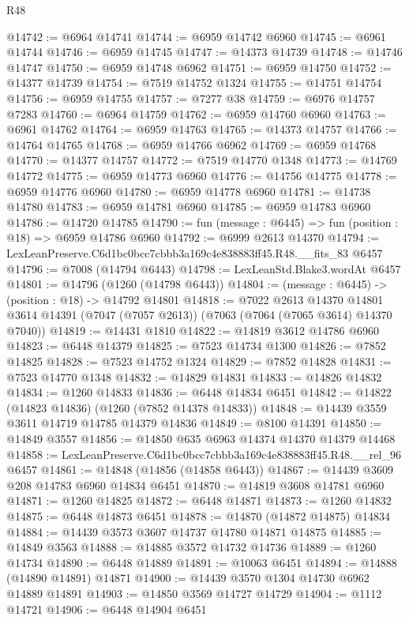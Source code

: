 \begin{lexlean}{R48}
\begin{coremodule}
@14742 := @6964 @14741
@14744 := @6959 @14742 @6960
@14745 := @6961 @14744
@14746 := @6959 @14745
@14747 := @14373 @14739
@14748 := @14746 @14747
@14750 := @6959 @14748 @6962
@14751 := @6959 @14750
@14752 := @14377 @14739
@14754 := @7519 @14752 @1324
@14755 := @14751 @14754
@14756 := @6959 @14755
@14757 := @7277 @38
@14759 := @6976 @14757 @7283
@14760 := @6964 @14759
@14762 := @6959 @14760 @6960
@14763 := @6961 @14762
@14764 := @6959 @14763
@14765 := @14373 @14757
@14766 := @14764 @14765
@14768 := @6959 @14766 @6962
@14769 := @6959 @14768
@14770 := @14377 @14757
@14772 := @7519 @14770 @1348
@14773 := @14769 @14772
@14775 := @6959 @14773 @6960
@14776 := @14756 @14775
@14778 := @6959 @14776 @6960
@14780 := @6959 @14778 @6960
@14781 := @14738 @14780
@14783 := @6959 @14781 @6960
@14785 := @6959 @14783 @6960
@14786 := @14720 @14785
@14790 := fun (message : @6445) => fun (position : @18) => @6959 @14786 @6960
@14792 := @6999 @2613 @14370
@14794 := LexLeanPreserve.C6d1bc0bcc7cbbb3a169c4e838883ff45.R48.__fits_83 @6457
@14796 := @7008 (@14794 @6443)
@14798 := LexLeanStd.Blake3.wordAt @6457
@14801 := @14796 (@1260 (@14798 @6443))
@14804 := (message : @6445) -> (position : @18) -> @14792 @14801
@14818 := @7022
    @2613
    @14370
    @14801
    @3614
    @14391
    (@7047 (@7057 @2613))
    (@7063 (@7064 (@7065 @3614) @14370 @7040))
@14819 := @14431 @1810
@14822 := @14819 @3612 @14786 @6960
@14823 := @6448 @14379
@14825 := @7523 @14734 @1300
@14826 := @7852 @14825
@14828 := @7523 @14752 @1324
@14829 := @7852 @14828
@14831 := @7523 @14770 @1348
@14832 := @14829 @14831
@14833 := @14826 @14832
@14834 := @1260 @14833
@14836 := @6448 @14834 @6451
@14842 := @14822 (@14823 @14836) (@1260 (@7852 @14378 @14833))
@14848 := @14439 @3559 @3611 @14719 @14785 @14379 @14836
@14849 := @8100 @14391
@14850 := @14849 @3557
@14856 := @14850 @635 @6963 @14374 @14370 @14379 @14468
@14858 := LexLeanPreserve.C6d1bc0bcc7cbbb3a169c4e838883ff45.R48.__rel_96 @6457
@14861 := @14848 (@14856 (@14858 @6443))
@14867 := @14439 @3609 @208 @14783 @6960 @14834 @6451
@14870 := @14819 @3608 @14781 @6960
@14871 := @1260 @14825
@14872 := @6448 @14871
@14873 := @1260 @14832
@14875 := @6448 @14873 @6451
@14878 := @14870 (@14872 @14875) @14834
@14884 := @14439 @3573 @3607 @14737 @14780 @14871 @14875
@14885 := @14849 @3563
@14888 := @14885 @3572 @14732 @14736
@14889 := @1260 @14734
@14890 := @6448 @14889
@14891 := @10063 @6451
@14894 := @14888 (@14890 @14891) @14871
@14900 := @14439 @3570 @1304 @14730 @6962 @14889 @14891
@14903 := @14850 @3569 @14727 @14729
@14904 := @1112 @14721
@14906 := @6448 @14904 @6451

\end{coremodule}
\end{lexlean}

